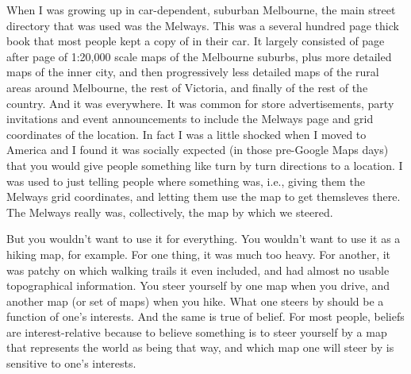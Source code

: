 \documentclass[
  11pt,
]{book}
\begin{document}
When I was growing up in car-dependent, suburban Melbourne, the main street directory that was used was the Melways. This was a several hundred page thick book that most people kept a copy of in their car. It largely consisted of page after page of 1:20,000 scale maps of the Melbourne suburbs, plus more detailed maps of the inner city, and then progressively less detailed maps of the rural areas around Melbourne, the rest of Victoria, and finally of the rest of the country. And it was everywhere. It was common for store advertisements, party invitations and event announcements to include the Melways page and grid coordinates of the location. In fact I was a little shocked when I moved to America and I found it was socially expected (in those pre-Google Maps days) that you would give people something like turn by turn directions to a location. I was used to just telling people where something was, i.e., giving them the Melways grid coordinates, and letting them use the map to get themsleves there. The Melways really was, collectively, the map by which we steered.

But you wouldn't want to use it for everything. You wouldn't want to use it as a hiking map, for example. For one thing, it was much too heavy. For another, it was patchy on which walking trails it even included, and had almost no usable topographical information. You steer yourself by one map when you drive, and another map (or set of maps) when you hike. What one steers by should be a function of one's interests. And the same is true of belief. For most people, beliefs are interest-relative because to believe something is to steer yourself by a map that represents the world as being that way, and which map one will steer by is sensitive to one's interests.
\end{document}
